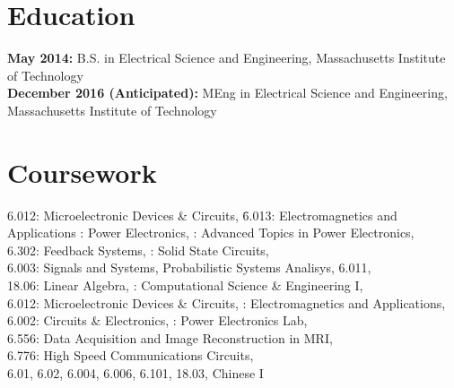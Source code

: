 \documentclass{res}
\begin{document}
 


\address{mspatz@mit.edu\\mark.h.spatz@gmail.com  }
\address{(816)-679-1502}

\begin{resume}
        
\section{Education}
\vspace{0.05in} 

{\bf May 2014:} B.S. in Electrical Science and Engineering, Massachusetts Institute of Technology\\
{\bf December 2016 (Anticipated):} MEng in Electrical Science and Engineering, Massachusetts Institute of Technology
\section{Coursework}
	\vspace{-0.05in}
	\begin{tabbing}
	6.012: Microelectronic Devices \& Circuits, \=6.013: Electromagnetics and Applications : Power Electronics, : Advanced Topics in Power Electronics,\\
	6.302: Feedback Systems,  : Solid State Circuits,\\
	6.003: Signals and Systems,  Probabilistic Systems Analisys, 6.011,\\
	18.06: Linear Algebra, : Computational Science \& Engineering I,\\
	6.012: Microelectronic Devices \& Circuits, : Electromagnetics and Applications,\\
	6.002: Circuits \& Electronics, : Power Electronics Lab,\\
	6.556: Data Acquisition and Image Reconstruction in MRI,\\
	6.776: High Speed Communications Circuits,\\
	6.01, 6.02, 6.004, 6.006, 6.101, 18.03, Chinese I
	\end{tabbing}


\end{resume}
\end{document}

